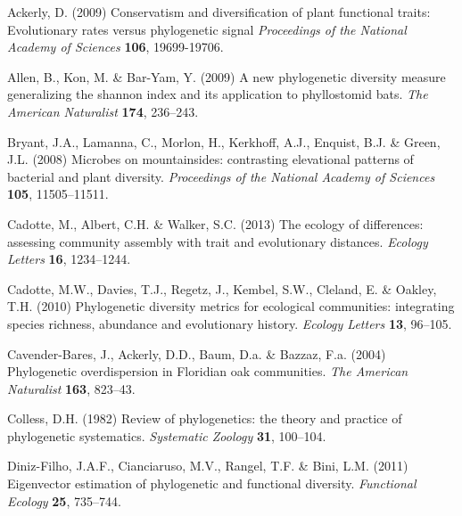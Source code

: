 \documentclass{bioinfo}
\begin{document}
\begin{thebibliography}{30}
\providecommand{\natexlab}[1]{#1}
\providecommand{\url}[1]{\texttt{#1}}
\providecommand{\urlprefix}{URL }

Ackerly, D. (2009) Conservatism and diversification of plant functional traits: Evolutionary rates versus phylogenetic signal \emph{Proceedings of the National Academy of
  Sciences} \textbf{106}, 19699-19706.

Allen, B., Kon, M. \& Bar-Yam, Y. (2009) A new phylogenetic diversity measure
  generalizing the shannon index and its application to phyllostomid bats.
  \emph{The American Naturalist} \textbf{174}, 236--243.

Bryant, J.A., Lamanna, C., Morlon, H., Kerkhoff, A.J., Enquist, B.J. \& Green,
  J.L. (2008) Microbes on mountainsides: contrasting elevational patterns of
  bacterial and plant diversity. \emph{Proceedings of the National Academy of
  Sciences} \textbf{105}, 11505--11511.

Cadotte, M., Albert, C.H. \& Walker, S.C. (2013) The ecology of differences:
  assessing community assembly with trait and evolutionary distances.
  \emph{Ecology Letters} \textbf{16}, 1234--1244.

Cadotte, M.W., Davies, T.J., Regetz, J., Kembel, S.W., Cleland, E. \& Oakley,
  T.H. (2010) Phylogenetic diversity metrics for ecological communities:
  integrating species richness, abundance and evolutionary history.
  \emph{Ecology Letters} \textbf{13}, 96--105.

Cavender-Bares, J., Ackerly, D.D., Baum, D.a. \& Bazzaz, F.a. (2004)
  {Phylogenetic overdispersion in Floridian oak communities}. \emph{The
  American Naturalist} \textbf{163}, 823--43.

Colless, D.H. (1982) Review of phylogenetics: the theory and practice of
  phylogenetic systematics. \emph{Systematic Zoology} \textbf{31}, 100--104.

Diniz-Filho, J.A.F., Cianciaruso, M.V., Rangel, T.F. \& Bini, L.M. (2011)
  Eigenvector estimation of phylogenetic and functional diversity.
  \emph{Functional Ecology} \textbf{25}, 735--744.


\end{thebibliography}
\end{document}
